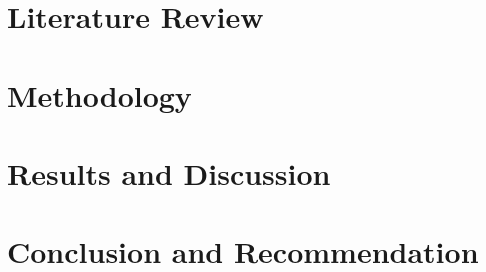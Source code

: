 \documentclass[a4paper,12pt,twoside]{report}
\begin{document}
\chapter{Literature Review}
\label{ch2}




\chapter{Methodology}
\label{ch3}




\chapter{Results and Discussion}
\label{ch4}




\chapter{Conclusion and Recommendation}
\label{ch5}




%


\end{document}
